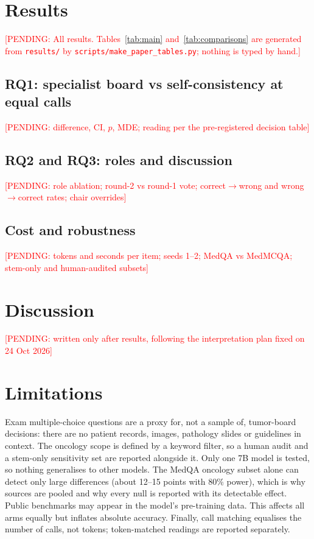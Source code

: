 \IfFileExists{IEEEtran.cls}{\documentclass[conference]{IEEEtran}}{\documentclass[10pt,twocolumn]{article}\usepackage[margin=0.75in]{geometry}}
\newcommand{\pending}[1]{\textcolor{red}{[PENDING: #1]}}
\begin{document}
\section{Results}
\pending{All results. Tables~\ref{tab:main} and~\ref{tab:comparisons} are generated from \texttt{results/} by \texttt{scripts/make\_paper\_tables.py}; nothing is typed by hand.}


\subsection{RQ1: specialist board vs self-consistency at equal calls}
\pending{difference, CI, $p$, MDE; reading per the pre-registered decision table}

\subsection{RQ2 and RQ3: roles and discussion}
\pending{role ablation; round-2 vs round-1 vote; correct$\to$wrong and wrong$\to$correct rates; chair overrides}

\subsection{Cost and robustness}
\pending{tokens and seconds per item; seeds 1--2; MedQA vs MedMCQA; stem-only and human-audited subsets}

\section{Discussion}
\pending{written only after results, following the interpretation plan fixed on 24 Oct 2026}

\section{Limitations}
Exam multiple-choice questions are a proxy for, not a sample of, tumor-board decisions: there are no patient records, images, pathology slides or guidelines in context. The oncology scope is defined by a keyword filter, so a human audit and a stem-only sensitivity set are reported alongside it. Only one 7B model is tested, so nothing generalises to other models. The MedQA oncology subset alone can detect only large differences (about 12--15 points with 80\% power), which is why sources are pooled and why every null is reported with its detectable effect. Public benchmarks may appear in the model's pre-training data. This affects all arms equally but inflates absolute accuracy. Finally, call matching equalises the number of calls, not tokens; token-matched readings are reported separately.
\end{document}
